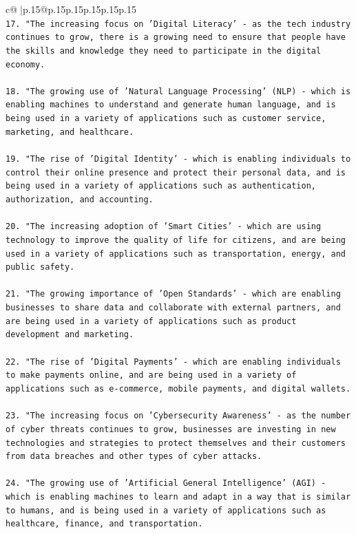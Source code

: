 \documentclass{article}
\begin{document}
{\begin{supertabular}{c@{$\;$}|p{.15\linewidth}@{}p{.15\linewidth}p{.15\linewidth}p{.15\linewidth}p{.15\linewidth}p{.15\linewidth}}
{{{\\ 
\texttt{17. "The increasing focus on 'Digital Literacy' {-} as the tech industry continues to grow, there is a growing need to ensure that people have the skills and knowledge they need to participate in the digital economy.} \\
\\ 
\texttt{18. "The growing use of 'Natural Language Processing' (NLP) {-} which is enabling machines to understand and generate human language, and is being used in a variety of applications such as customer service, marketing, and healthcare.} \\
\\ 
\texttt{19. "The rise of 'Digital Identity' {-} which is enabling individuals to control their online presence and protect their personal data, and is being used in a variety of applications such as authentication, authorization, and accounting.} \\
\\ 
\texttt{20. "The increasing adoption of 'Smart Cities' {-} which are using technology to improve the quality of life for citizens, and are being used in a variety of applications such as transportation, energy, and public safety.} \\
\\ 
\texttt{21. "The growing importance of 'Open Standards' {-} which are enabling businesses to share data and collaborate with external partners, and are being used in a variety of applications such as product development and marketing.} \\
\\ 
\texttt{22. "The rise of 'Digital Payments' {-} which are enabling individuals to make payments online, and are being used in a variety of applications such as e{-}commerce, mobile payments, and digital wallets.} \\
\\ 
\texttt{23. "The increasing focus on 'Cybersecurity Awareness' {-} as the number of cyber threats continues to grow, businesses are investing in new technologies and strategies to protect themselves and their customers from data breaches and other types of cyber attacks.} \\
\\ 
\texttt{24. "The growing use of 'Artificial General Intelligence' (AGI) {-} which is enabling machines to learn and adapt in a way that is similar to humans, and is being used in a variety of applications such as healthcare, finance, and transportation.} \\
}}}
\end{supertabular}}
\end{document}
